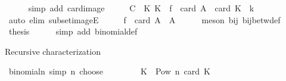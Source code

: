 \begin{isabellebody}
\ \ \ \ \isamarkupfalse%
\ {\isacharparenleft}{\kern0pt}simp\ add{\isacharcolon}{\kern0pt}\ card{\isacharunderscore}{\kern0pt}image{\isacharparenright}{\kern0pt}\isanewline
\ \ \isamarkupfalse%
\ \isamarkupfalse%
\ {\isachardoublequoteopen}{\isacharquery}{\kern0pt}C\ {\isacharequal}{\kern0pt}\ {\isacharbraceleft}{\kern0pt}K{\isachardot}{\kern0pt}\ K\ {\isasymsubseteq}\ f\ {\isacharbackquote}{\kern0pt}\ {\isacharbraceleft}{\kern0pt}{}{\isachardot}{\kern0pt}{\isachardot}{\kern0pt}{\isacharless}{\kern0pt}card\ A{\isacharbraceright}{\kern0pt}\ {\isasymand}\ card\ K\ {\isacharequal}{\kern0pt}\ k{\isacharbraceright}{\kern0pt}{\isachardoublequoteclose}\isanewline
\ \ \ \ \isamarkupfalse%
\ {\isacharparenleft}{\kern0pt}auto\ elim{\isacharbang}{\kern0pt}{\isacharcolon}{\kern0pt}\ subset{\isacharunderscore}{\kern0pt}imageE{\isacharparenright}{\kern0pt}\isanewline
\ \ \isamarkupfalse%
\ \isamarkupfalse%
\ {\isachardoublequoteopen}f\ {\isacharbackquote}{\kern0pt}\ {\isacharbraceleft}{\kern0pt}{}{\isachardot}{\kern0pt}{\isachardot}{\kern0pt}{\isacharless}{\kern0pt}card\ A{\isacharbraceright}{\kern0pt}\ {\isacharequal}{\kern0pt}\ A{\isachardoublequoteclose}\isanewline
\ \ \ \ \isamarkupfalse%
\ {\isacharparenleft}{\kern0pt}meson\ bij\ bij{\isacharunderscore}{\kern0pt}betw{\isacharunderscore}{\kern0pt}def{\isacharparenright}{\kern0pt}\isanewline
\ \ \isamarkupfalse%
\ \isamarkupfalse%
\ {\isacharquery}{\kern0pt}thesis\isanewline
\ \ \ \ \isamarkupfalse%
\ {\isacharparenleft}{\kern0pt}simp\ add{\isacharcolon}{\kern0pt}\ binomial{\isacharunderscore}{\kern0pt}def{\isacharparenright}{\kern0pt}\isanewline
{}\isamarkupfalse%
%
\endisatagproof
{\isafoldproof}%
%
\isadelimproof
%
\endisadelimproof
%
\begin{isamarkuptext}%
Recursive characterization%
\end{isamarkuptext}\isamarkuptrue%
\isamarkupfalse%
\ binomial{\isacharunderscore}{\kern0pt}n{\isacharunderscore}{\kern0pt}{}\ {\isacharbrackleft}{\kern0pt}simp{\isacharbrackright}{\kern0pt}{\isacharcolon}{\kern0pt}\ {\isachardoublequoteopen}n\ choose\ {}\ {\isacharequal}{\kern0pt}\ {}{\isachardoublequoteclose}\isanewline
%
\isadelimproof
%
\endisadelimproof
%
\isatagproof
{}\isamarkupfalse%
\ {\isacharminus}{\kern0pt}\isanewline
\ \ \isamarkupfalse%
\ {\isachardoublequoteopen}{\isacharbraceleft}{\kern0pt}K\ {\isasymin}\ Pow\ {\isacharbraceleft}{\kern0pt}{}{\isachardot}{\kern0pt}{\isachardot}{\kern0pt}{\isacharless}{\kern0pt}n{\isacharbraceright}{\kern0pt}{\isachardot}{\kern0pt}\ card\ K\ {\isacharequal}{\kern0pt}\ {}{\isacharbraceright}{\kern0pt}\ {\isacharequal}{\kern0pt}\ {\isacharbraceleft}{\kern0pt}{\isacharbraceleft}{\kern0pt}{\isacharbraceright}{\kern0pt}{\isacharbraceright}{\kern0pt}{\isachardoublequoteclose}\isanewline

\end{isabellebody}
